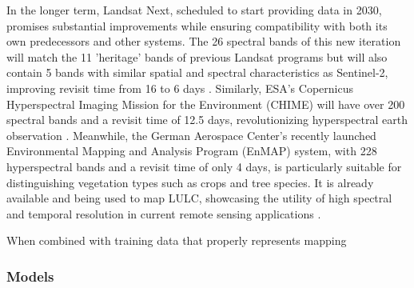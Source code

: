         In the longer term, Landsat Next, scheduled to start providing data in 2030, promises substantial improvements while ensuring compatibility with both its own predecessors and other systems. The 26 spectral bands of this new iteration will match the 11 'heritage' bands of previous Landsat programs but will also contain 5 bands with similar spatial and spectral characteristics as Sentinel-2, improving revisit time from 16 to 6 days \citep{landsatnext2023}. Similarly, ESA's Copernicus Hyperspectral Imaging Mission for the Environment (CHIME) will have over 200 spectral bands and a revisit time of 12.5 days, revolutionizing hyperspectral earth observation \citep{nieke2023copernicus}. Meanwhile, the German Aerospace Center's recently launched Environmental Mapping and Analysis Program (EnMAP) system, with 228 hyperspectral bands and a revisit time of only 4 days, is particularly suitable for distinguishing vegetation types such as crops and tree species. It is already available and being used to map LULC, showcasing the utility of high spectral and temporal resolution in current remote sensing applications \citep{storch2023enmap, lekka2024appraisal}.

    

        When combined with training data that properly represents mapping 

        \subsubsection{Models}

        \citep{xu2021towards} %
        
